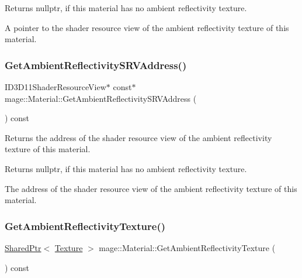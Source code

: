 \begin{DoxyReturn}{Returns}
{\ttfamily nullptr}, if this material has no ambient reflectivity texture. 

A pointer to the shader resource view of the ambient reflectivity texture of this material. 
\end{DoxyReturn}
\hypertarget{structmage_1_1_material_a52b0428fb9aeba97dcd8b5c7eb09836f}{}\label{structmage_1_1_material_a52b0428fb9aeba97dcd8b5c7eb09836f} 
\subsubsection{\texorpdfstring{Get\+Ambient\+Reflectivity\+S\+R\+V\+Address()}{GetAmbientReflectivitySRVAddress()}}
{\footnotesize\ttfamily I\+D3\+D11\+Shader\+Resource\+View$\ast$ const$\ast$ mage\+::\+Material\+::\+Get\+Ambient\+Reflectivity\+S\+R\+V\+Address (\begin{DoxyParamCaption}{ }\end{DoxyParamCaption}) const\hspace{0.3cm}{\ttfamily [noexcept]}}

Returns the address of the shader resource view of the ambient reflectivity texture of this material.

\begin{DoxyReturn}{Returns}
{\ttfamily nullptr}, if this material has no ambient reflectivity texture. 

The address of the shader resource view of the ambient reflectivity texture of this material. 
\end{DoxyReturn}
\hypertarget{structmage_1_1_material_a231f4f13768d54af5a587266f45d734c}{}\label{structmage_1_1_material_a231f4f13768d54af5a587266f45d734c} 
\subsubsection{\texorpdfstring{Get\+Ambient\+Reflectivity\+Texture()}{GetAmbientReflectivityTexture()}}
{\footnotesize\ttfamily \hyperlink{namespacemage_a1e01ae66713838a7a67d30e44c67703e}{Shared\+Ptr}$<$ \hyperlink{classmage_1_1_texture}{Texture} $>$ mage\+::\+Material\+::\+Get\+Ambient\+Reflectivity\+Texture (\begin{DoxyParamCaption}{ }\end{DoxyParamCaption}) const\hspace{0.3cm}{\ttfamily [noexcept]}}

